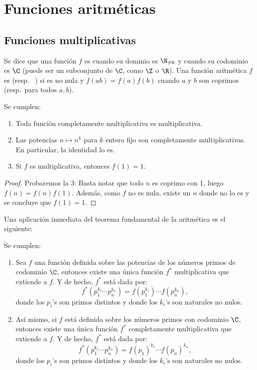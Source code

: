 \documentclass[teoria-numeros.tex]{subfiles}
\begin{document}
\chapter{Funciones aritméticas}
\label{ch:arithmetic_func}

\section{Funciones multiplicativas}
\nocite{hua:number}
\begin{mydef}
	Se dice que una función $f$ es  cuando su dominio es $\N_{\ne 0}$ y cuando su codominio es $\C$
	(puede ser un subconjunto de $\C$, como $\Z$ o $\R$).
	Una función aritmética $f$ es  (resp.\ %
	) si es no nula y $f(ab) = f(a)f(b)$ cuando $a$ y $b$ son coprimos (resp.\ para todos $a, b$).
\end{mydef}

\begin{prop}
	Se cumplen:
	\begin{enumerate}
		\item Toda función completamente multiplicativa es multiplicativa.
		\item Las potencias $n \mapsto n^k$ para $k$ entero fijo son completamente multiplicativas.
			En particular, la identidad lo es.
		\item Si $f$ es multiplicativa, entonces $f(1) = 1$.
	\end{enumerate}
\end{prop}
\begin{proof}
	Probaremos la 3:
	Basta notar que todo $n$ es coprimo con 1, luego $f(n) = f(n)f(1)$.
	Además, como $f$ no es nula, existe un $n$ donde no lo es y se concluye que $f(1) = 1$.
\end{proof}

Una aplicación inmediata del teorema fundamental de la aritmética es el siguiente:
\begin{thm}
	Se cumplen:
	\begin{enumerate}
		\item Sea $f$ una función definida sobre las potencias de los números primos de codominio $\C$,
			entonces existe una única función $f^*$ multiplicativa que extiende a $f$.
			Y de hecho, $f^*$ está dada por:
			$$ f^*(p_1^{k_1}\cdots p_n^{k_n}) = f(p_1^{k_1}) \cdots f(p_n^{k_n}), $$
			donde los $p_i$'s son primos distintos y donde los $k_i$'s son naturales no nulos.

		\item Así mismo, si $f$ está definida sobre los números primos con codominio $\C$,
			entonces existe una única función $f^*$ completamente multiplicativa que extiende a $f$.
			Y de hecho, $f^*$ está dada por:
			$$ f^*(p_1^{k_1}\cdots p_n^{k_n}) = f(p_1)^{k_1} \cdots f(p_n)^{k_n}, $$
			donde los $p_i$'s son primos distintos y donde los $k_i$'s son naturales no nulos.
	\end{enumerate}
\end{thm}
\end{document}
